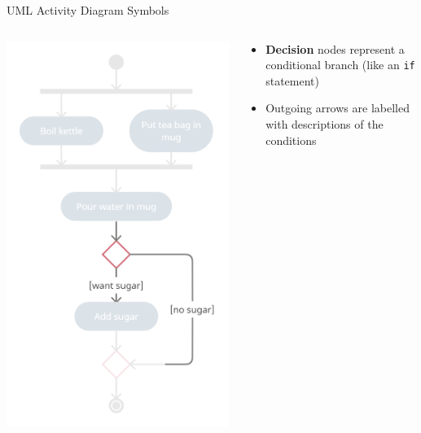 \begin{frame}{UML Activity Diagram Symbols}
	\begin{columns}
		\begin{column}{0.4\textwidth}
			\includegraphics[width=\textwidth]{ad_decision}
		\end{column}
		\begin{column}{0.58\textwidth}
			\begin{itemize}
				\pause\item \textbf{Decision} nodes represent a conditional branch (like an \texttt{if} statement)
				\pause\item Outgoing arrows are labelled with descriptions of the conditions
			\end{itemize}
		\end{column}
	\end{columns}
\end{frame}

